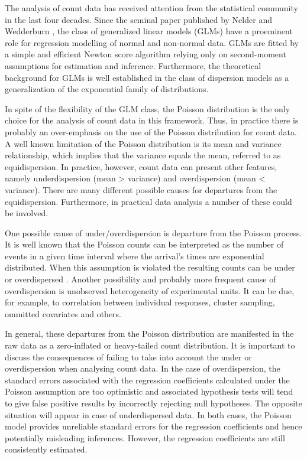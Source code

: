 \documentclass[9pt,a5paper,]{book}
\theoremstyle{definition}
\theoremstyle{definition}
\theoremstyle{remark}
\begin{document}
The analysis of count data has received attention from the statistical
community in the last four decades. Since the seminal paper published by
Nelder and Wedderburn \citep{Nelder1972}, the class of generalized
linear models (GLMs) have a proeminent role for regression modelling of
normal and non-normal data. GLMs are fitted by a simple and efficient
Newton score algorithm relying only on second-moment assumptions for
estimation and inference. Furthermore, the theoretical background for
GLMs is well established in the class of dispersion models
\citep{Jorgensen1987, Jorgensen1997} as a generalization of the
exponential family of distributions.

In spite of the flexibility of the GLM class, the Poisson distribution
is the only choice for the analysis of count data in this framework.
Thus, in practice there is probably an over-emphasis on the use of the
Poisson distribution for count data. A well known limitation of the
Poisson distribution is its mean and variance relationship, which
implies that the variance equals the mean, referred to as
equidispersion. In practice, however, count data can present other
features, namely underdispersion (mean \textgreater{} variance) and
overdispersion (mean \textless{} variance). There are many different
possible causes for departures from the equidispersion. Furthermore, in
practical data analysis a number of these could be involved.

One possible cause of under/overdispersion is departure from the Poisson
process. It is well known that the Poisson counts can be interpreted as
the number of events in a given time interval where the arrival's times
are exponential distributed. When this assumption is violated the
resulting counts can be under or overdispersed \citep{Zeviani2014}.
Another possibility and probably more frequent cause of overdispersion
is unobserved heterogeneity of experimental units. It can be due, for
example, to correlation between individual responses, cluster sampling,
ommitted covariates and others.

In general, these departures from the Poisson distribution are
manifested in the raw data as a zero-inflated or heavy-tailed count
distribution. It is important to discuss the consequences of failing to
take into account the under or overdispersion when analysing count data.
In the case of overdispersion, the standard errors associated with the
regression coefficients calculated under the Poisson assumption are too
optimistic and associated hypothesis tests will tend to give false
positive results by incorrectly rejecting null hypotheses. The opposite
situation will appear in case of underdispersed data. In both cases, the
Poisson model provides unreliable standard errors for the regression
coefficients and hence potentially misleading inferences. However, the
regression coefficients are still consistently estimated.
\end{document}
